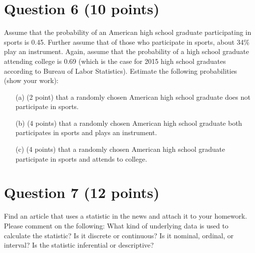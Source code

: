 \documentclass[12pt,letterpaper]{article}
\begin{document}
	\section*{Question 6 (10 points)}
	Assume that the probability of an American high school graduate participating in sports is 0.45. Further assume that of those who participate in sports, about 34\% play an instrument. Again, assume that the probability of a high school graduate attending college is 0.69 (which is the case for 2015 high school graduates according to Bureau of Labor Statistics). Estimate the following probabilities (show your work):
	
	\begin{itemize}
		\item[(a)] (2 point) that a randomly chosen American high school graduate does not participate in sports.
		\item[(b)] (4 points) that a randomly chosen American high school graduate both participates in sports and plays an instrument.
		\item[(c)] (4 points) that a randomly chosen American high school graduate participate in sports and attends to college.
	\end{itemize}
	
	\section*{Question 7 (12 points)}
	Find an article that uses a statistic in the news and attach it to your homework. Please comment on the following: What kind of underlying data is used to calculate the statistic? Is it discrete or continuous? Is it nominal, ordinal, or interval? Is the statistic inferential or descriptive?
	
\end{document}
